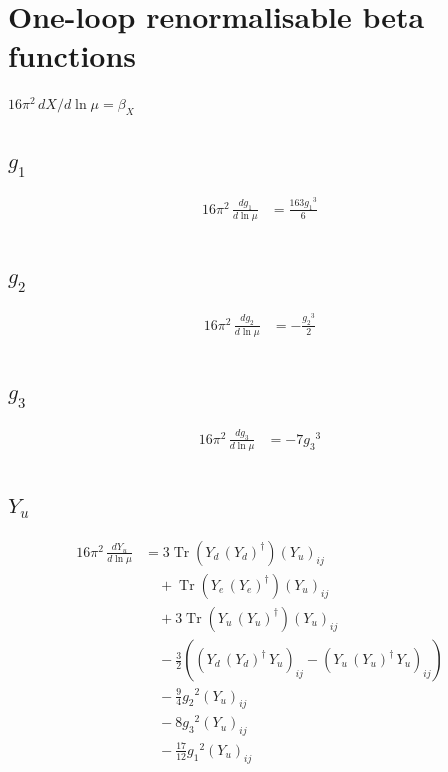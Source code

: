 \documentclass[10pt,a4paper]{article}
\begin{document}
\section*{One-loop renormalisable beta functions}
$16\pi^2\,dX/d\ln\mu=\beta_X$
\subsection*{$g_1$}
\begin{align*}
16\pi^2\,\frac{d g_1}{d\ln\mu} &=\frac{163 {g_1}^3}{6} \\
\end{align*}
\subsection*{$g_2$}
\begin{align*}
16\pi^2\,\frac{d g_2}{d\ln\mu} &=-\frac{{g_2}^3}{2} \\
\end{align*}
\subsection*{$g_3$}
\begin{align*}
16\pi^2\,\frac{d g_3}{d\ln\mu} &=-7 {g_3}^3 \\
\end{align*}
\subsection*{$Y_u$}
\begin{align*}
16\pi^2\,\frac{d Y_u}{d\ln\mu} &=3 \operatorname{Tr}\!\left({Y_d}\,\left({Y_d}\right)^{\dagger}\right) \left({Y_u}\right)_{ij} \\
&\quad +\operatorname{Tr}\!\left({Y_e}\,\left({Y_e}\right)^{\dagger}\right) \left({Y_u}\right)_{ij} \\
&\quad +3 \operatorname{Tr}\!\left({Y_u}\,\left({Y_u}\right)^{\dagger}\right) \left({Y_u}\right)_{ij} \\
&\quad -\frac{3}{2} (\left({Y_d}\,\left({Y_d}\right)^{\dagger}\,{Y_u}\right)_{ij}-\left({Y_u}\,\left({Y_u}\right)^{\dagger}\,{Y_u}\right)_{ij}) \\
&\quad -\frac{9}{4} {g_2}^2 \left({Y_u}\right)_{ij} \\
&\quad -8 {g_3}^2 \left({Y_u}\right)_{ij} \\
&\quad -\frac{17}{12} {g_1}^2 \left({Y_u}\right)_{ij} \\
\end{align*}
\end{document}
